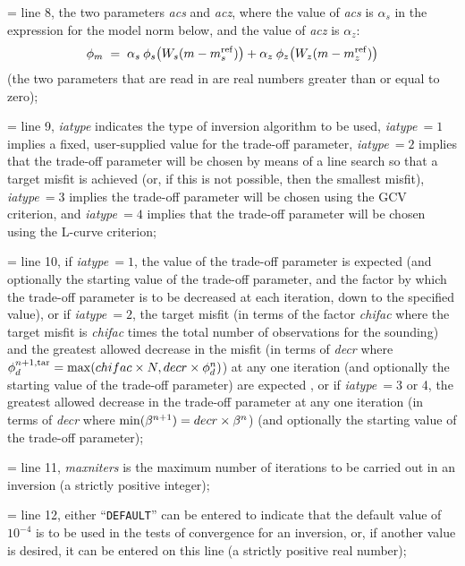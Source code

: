 \hangindent=\parindent{}\noindent
line 8, the two parameters {\sl acs\/} and {\sl acz\/}, where the value of {\sl acs\/} is
$\alpha_s$ in the expression for the model norm below, and the value of {\sl acz\/} is $\alpha_z$:
$$
\phi_m\;=\;\alpha_s\>\phi_s\big(W_s(m-m_s^{\rm ref})\big)+
\alpha_z\>\phi_z\big(W_z(m-m_z^{\rm ref})\big)
$$
(the two parameters that are read in are real numbers greater than or equal to zero);

\hangindent=\parindent{}\noindent
line 9, {\sl iatype\/} indicates the type of inversion algorithm to be used, {\sl iatype\/}$\>=1$
implies a fixed, user-supplied value for the trade-off parameter, {\sl iatype\/}$\>=2$ implies
that the trade-off parameter will be chosen by means of a line search so that a target misfit is
achieved (or, if this is not possible, then the smallest misfit), {\sl iatype\/}$\>=3$ implies
the trade-off parameter will be chosen using the GCV criterion, and {\sl iatype\/}$\>=4$ implies
that the trade-off parameter will be chosen using the L-curve criterion;

\hangindent=\parindent{}\noindent
line 10, if {\sl iatype\/}$\>=1$, the value of the trade-off parameter is expected (and
optionally the starting value of the trade-off parameter, and the factor by which the
trade-off parameter is to be decreased at each iteration, down to the specified value), or if
{\sl iatype\/}$\>=2$, the target misfit (in terms of the factor {\sl chifac\/} where the target
misfit is {\sl chifac\/} times the total number of observations for the sounding) and the greatest
allowed decrease in the misfit (in terms of {\sl decr\/} where
$\phi_d^{n+1,{\rm tar}}={\rm max}({\sl chifac\/}\times N,{\sl decr}\times\phi_d^n)$) at any one
iteration (and optionally the starting value of the trade-off parameter) are expected , or if
{\sl iatype\/}$\>=$3 or 4, the greatest allowed decrease in the trade-off parameter at any one
iteration (in terms of {\sl decr\/} where ${\rm min}(\beta^{n+1})={\sl decr}\times\beta^n$)
(and optionally the starting value of the trade-off parameter);

\hangindent=\parindent{}\noindent
line 11, {\sl maxniters\/} is the maximum number of iterations to be carried out in an
inversion (a strictly positive integer);

\hangindent=\parindent{}\noindent
line 12, either ``{\tt DEFAULT}'' can be entered to indicate that the default value of $10^{-4}$ is
to be used in the tests of convergence for an inversion, or, if another value is desired, it can
be entered on this line (a strictly positive real number);

